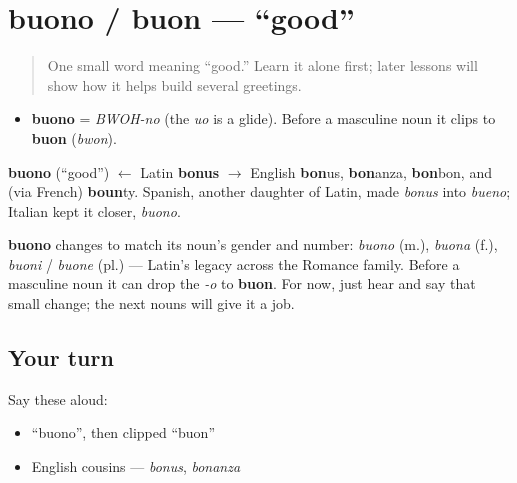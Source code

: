 \section[buono / buon]{buono / buon — \textquotedblleft{}good\textquotedblright{}}

\label{lesson:IT-C01-buono}



\begin{quote}
One small word meaning \textquotedblleft{}good.\textquotedblright{} Learn it alone first; later lessons will show how it helps build several greetings.
\end{quote}

\begin{sounds}
\begin{itemize}
\raggedright
  \item \textbf{buono} = \emph{BWOH-no} (the \emph{uo} is a glide). Before a masculine noun it clips to \textbf{buon} (\emph{bwon}).
\end{itemize}
\end{sounds}

\begin{cousinweb}
\textbf{buono} (\textquotedblleft{}good\textquotedblright{}) $\leftarrow$ Latin \textbf{bonus} $\to$ English \textbf{bon}us, \textbf{bon}anza, \textbf{bon}bon, and (via French) \textbf{boun}ty. Spanish, another daughter of Latin, made \emph{bonus} into \emph{bueno}; Italian kept it closer, \emph{buono}.
\end{cousinweb}

\begin{grammarlens}[title={Grammar Lens: it agrees with the noun}]
\textbf{buono} changes to match its noun's gender and number: \emph{buono} (m.), \emph{buona} (f.), \emph{buoni} / \emph{buone} (pl.) — Latin's legacy across the Romance family. Before a masculine noun it can drop the \emph{-o} to \textbf{buon}. For now, just hear and say that small change; the next nouns will give it a job.
\end{grammarlens}

\subsection*{Your turn}
Say these aloud:

\begin{itemize}
\raggedright
  \item \textquotedblleft{}buono\textquotedblright{}, then clipped \textquotedblleft{}buon\textquotedblright{}
  \item English cousins — \emph{bonus}, \emph{bonanza}
\end{itemize}

